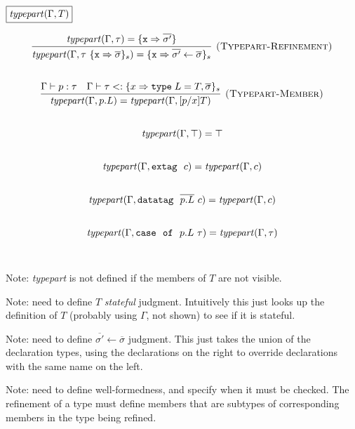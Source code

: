 \documentclass{article}
\newcommand{\keywadj}[1]{\mathtt{#1}}
\newcommand{\keyw}[1]{\keywadj{#1}~}
\begin{document}
$\fbox{$\mathit{typepart}(\Gamma, T)$}$

\[
\begin{array}{c}

\infer[\textsc{(Typepart-Refinement)}]
  {\mathit{typepart}(\Gamma, \tau ~ \{\texttt{x} \Rightarrow \overline{\sigma}\}_{s}) = \{\texttt{x} \Rightarrow \overline{\sigma'} \leftarrow \overline{\sigma}\}_{s}}
  {\mathit{typepart}(\Gamma, \tau) = \{\texttt{x} \Rightarrow \overline{\sigma'}\}}\\[5ex]

\infer[\textsc{(Typepart-Member)}]
  {\mathit{typepart}(\Gamma, p.L) = \mathit{typepart}(\Gamma, [p/x]T)}
  {\Gamma \vdash p : \tau & \Gamma \vdash \tau <: \{x \Rightarrow \texttt{type} \; L = T, \overline{\sigma}\}_{s}}\\[5ex]

\mathit{typepart}(\Gamma, \top) = \top\\[5ex]

\mathit{typepart}(\Gamma, \keyw{extag}~c) = \mathit{typepart}(\Gamma, c)\\[5ex]

\mathit{typepart}(\Gamma, \keyw{datatag}~\overline{p.L}~c) = \mathit{typepart}(\Gamma, c)\\[5ex]

\mathit{typepart}(\Gamma, \keyw{case}~\keyw{of}~p.L~\tau) = \mathit{typepart}(\Gamma, \tau)\\[5ex]

\end{array}
\]

Note: \textit{typepart} is not defined if the members of $T$ are not visible.

Note: need to define $T$ \textit{stateful} judgment.  Intuitively this just looks up the definition of $T$ (probably using $\Gamma$, not shown) to see if it is stateful.

Note: need to define $\overline{\sigma'} \leftarrow \overline{\sigma}$ judgment.  This just takes the union of the declaration types, using the declarations on the right to override declarations with the same name on the left.

Note: need to define well-formedness, and specify when it must be checked.  The refinement of a type must define members that are subtypes of corresponding members in the type being refined.



\end{document}
